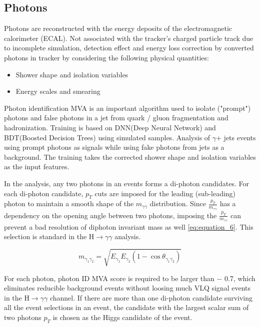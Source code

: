 \subsection{Photons}
Photons are reconstructed with the energy deposits of the electromagnetic calorimeter (ECAL). Not associated with the tracker's charged particle track due to incomplete simulation, detection effect and energy loss correction by converted photons in  tracker by considering the following physical quantities:
\begin{itemize}
    \item Shower shape and isolation variables
    \item Energy scales and smearing
\end{itemize}


Photon identification MVA is an important algorithm used to isolate ("prompt") photons and false photons in a jet from quark / gluon fragmentation and hadronization. Training is  based on DNN(Deep Neural Network) and BDT(Boosted Decision Trees) using simulated samples. 
 Analysis of $\gamma$+ jets events using prompt photons  as signals while using fake photons from jets as a background. The training takes the corrected shower shape and isolation variables as the input features. 
 
 
 In the analysis, any two photons in an events forms a di-photon candidates. For each di-photon candidate, $p_T$ cuts  are imposed for the leading (sub-leading) photon to maintain a smooth shape of the $m_{\gamma\gamma}$ distribution. Since $\frac{p_T}{m_{\gamma\gamma}}$ has a dependency on the opening angle between two photons, imposing the $\frac{p_T}{m_{\gamma\gamma}}$ can prevent a bad resolution of diphoton invariant mass as well \autoref{eq:equation_6}. This selection is standard in the H$\longrightarrow \gamma\gamma$ analysis.
 
 \begin{equation}\label{eq:equation_6}
     m_{\gamma_1\gamma_2} = \sqrt{E_{\gamma_1}E_{\gamma_2}(1- \cos{\theta_{\gamma_1\gamma_2}})}
 \end{equation}
 
 For each photon, photon ID MVA score is required to be larger than − 0.7, which eliminates
reducible background events without loosing much VLQ signal events in the H$\longrightarrow \gamma\gamma$ channel.
If there are more than one di-photon candidate surviving all the event selections in an event, the candidate with the largest scalar sum of two photons $p_T$ is chosen as the Higgs candidate of the event.

